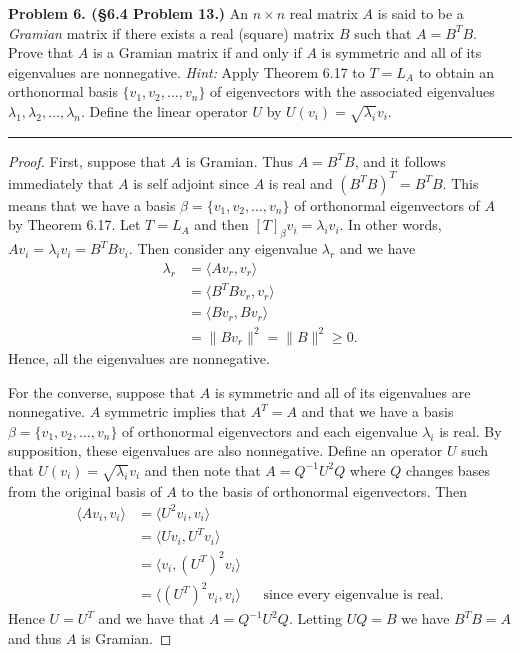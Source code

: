 \documentclass[leqno]{article}
\theoremstyle{nonumberplain}
\newtheorem{proof}{Proof}
\begin{document}
\pagebreak




\noindent\textbf{Problem 6. (\S 6.4 Problem 13.)} An $n\times n$ real matrix $A$ is said to be a \emph{Gramian} matrix if there exists a real (square) matrix $B$ such that $A=B^T B$. Prove that $A$ is a Gramian matrix if and only if $A$ is symmetric and all of its eigenvalues are nonnegative. \emph{Hint:} Apply Theorem 6.17 to $T=L_A$ to obtain an orthonormal basis $\{v_1,v_2,\dots, v_n\}$ of eigenvectors with the associated eigenvalues $\lambda_1,\lambda_2,\dots,\lambda_n$. Define the linear operator $U$ by $U(v_i)=\sqrt{\lambda_i}v_i$.


\noindent\rule[0.5ex]{\linewidth}{1pt}

\begin{proof}
First, suppose that $A$ is Gramian.  Thus $A=B^T B$, and it follows immediately that $A$ is self adjoint since $A$ is real and $(B^T B)^T = B^T B$.  This means that we have a basis $\beta = \{v_1,v_2,\dots,v_n\}$ of orthonormal eigenvectors of $A$ by Theorem 6.17.  Let $T=L_A$ and then $[T]_\beta v_i = \lambda_i v_i$.  In other words, $Av_i=\lambda_i v_i = B^T B v_i$. Then consider any eigenvalue $\lambda_r$ and we have
\begin{align*}
\lambda_r &= \langle Av_r,v_r \rangle \\
&= \langle B^T B v_r,v_r \rangle\\
&= \langle B v_r, B v_r \rangle\\
&= \|Bv_r\|^2 = \|B\|^2 \geq 0.
\end{align*}
Hence, all the eigenvalues are nonnegative.

For the converse, suppose that $A$ is symmetric and all of its eigenvalues are nonnegative.  $A$ symmetric implies that $A^T = A$ and that we have a basis $\beta=\{v_1,v_2,\dots,v_n\}$ of orthonormal eigenvectors and each eigenvalue $\lambda_i$ is real.  By supposition, these eigenvalues are also nonnegative.  Define an operator $U$ such that $U(v_i)=\sqrt{\lambda_i}v_i$ and then note that $A=Q^{-1}U^2Q$ where $Q$ changes bases from the original basis of $A$ to the basis of orthonormal eigenvectors.  Then
\begin{align*}
\langle Av_i, v_i \rangle &= \langle U^2 v_i, v_i \rangle\\
 &= \langle U v_i, U^T v_i \rangle\\
 &= \langle v_i, (U^T)^2 v_i \rangle\\
 &= \langle (U^T)^2 v_i,v_i \rangle && \textrm{since every eigenvalue is real.}
\end{align*}
Hence $U=U^T$ and we have that $A=Q^{-1}U^2Q$. Letting $UQ=B$ we have $B^TB=A$ and  thus $A$ is Gramian.   
\end{proof}

\pagebreak
\end{document}
